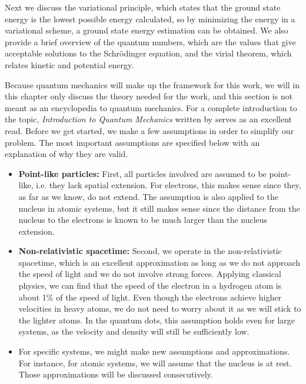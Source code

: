 Next we discuss the variational principle, which states that the ground state energy is the lowest possible energy calculated, so by minimizing the energy in a variational scheme, a ground state energy estimation can be obtained. We also provide a brief overview of the quantum numbers, which are the values that give acceptable solutions to the Schrödinger equation, and the virial theorem, which relates kinetic and potential energy. 

Because quantum mechanics will make up the framework for this work, we will in this chapter only discuss the theory needed for the work, and this section is not meant as an encyclopedia to quantum mechanics. For a complete introduction to the topic, \textit{Introduction to Quantum Mechanics} written by \citet{griffiths_introduction_2005} serves as an excellent read. Before we get started, we make a few assumptions in order to simplify our problem. The most important assumptions are specified below with an explanation of why they are valid.

\begin{itemize}
	\item \textbf{Point-like particles:} First, all particles involved are assumed to be point-like, i.e. they lack spatial extension. For electrons, this makes sense since they, as far as we know, do not extend. The assumption is also applied to the nucleus in atomic systems, but it still makes sense since the distance from the nucleus to the electrons is known to be much larger than the nucleus extension.
	
	\item \textbf{Non-relativistic spacetime:}  Second, we operate in the non-relativistic spacetime, which is an excellent approximation as long as we do not approach the speed of light and we do not involve strong forces. Applying classical physics, we can find that the speed of the electron in a hydrogen atom is about 1\% of the speed of light. Even though the electrons achieve higher velocities in heavy atoms, we do not need to worry about it as we will stick to the lighter atoms. In the quantum dots, this assumption holds even for large systems, as the velocity and density will still be sufficiently low.
	
	\item For specific systems, we might make new assumptions and approximations. For instance, for atomic systems, we will assume that the nucleus is at rest. Those approximations will be discussed consecutively. 
\end{itemize}


